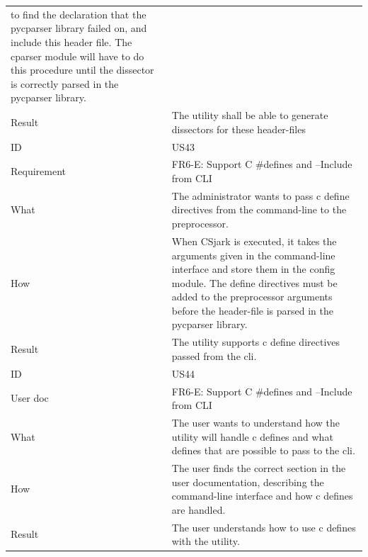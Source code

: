 \begin{table}[htbp]
{\begin{tabularx}{1.2\textwidth}{l X}
	to find the declaration that the \gls{pycparser} \gls{library} failed on, and include this \gls{header} file. The cparser module will have to do this procedure until the \gls{dissector} is correctly parsed in the \gls{pycparser} \gls{library}. \\
	Result & The \gls{utility} shall be able to generate \glspl{dissector} for these \gls{header}-files \\	
	\midrule
	ID & US43 \\
	Requirement & FR6-E: Support C \#defines and --Include from CLI  \\
	What & The administrator wants to pass \Gls{c} \gls{define} directives from the command-line to the \gls{preprocessor}.   \\
	How & When CSjark is executed, it takes the arguments given in the command-line interface and store them in the config module.
	The \gls{define} directives must be added to the \gls{preprocessor} arguments before the \gls{header}-file is parsed in the \gls{pycparser} \gls{library}.   \\
	Result & The \gls{utility} supports \Gls{c} \gls{define} directives passed from the \gls{cli}. \\
	\midrule
	ID & US44 \\
	User doc & FR6-E:  Support C \#defines and --Include from CLI \\
	What & The user wants to understand how the \gls{utility} will handle \Gls{c} \glspl{define} and what \glspl{define} that are possible to pass to the \gls{cli}.   \\
	How & The user finds the correct section in the user documentation, describing the command-line interface and how \Gls{c} \glspl{define} are handled.  \\
	Result & The user understands how to use \Gls{c} \glspl{define} with the \gls{utility}. \\
	\bottomrule
\end{tabularx}}
\end{table}

